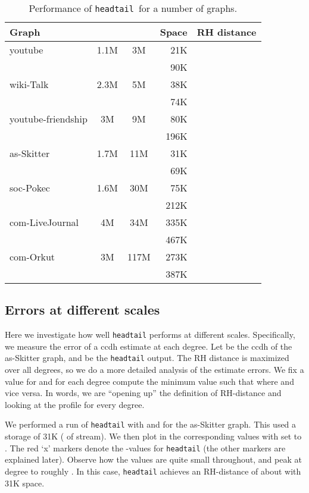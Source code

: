 \documentclass[11pt]{article}
\theoremstyle{definition}
\newcommand{\degdist}{{\tt headtail}}
\begin{document}
\begin{table}
\small
\centering
\begin{tabular}{l|c|c|r|l}
\hline
Graph &  &  & Space & RH distance\\
\hline\hline
youtube & 1.1M & 3M & 21K & \\
& & & 90K & \\\hline
wiki-Talk & 2.3M & 5M & 38K & \\
& & & 74K & \\\hline
youtube-friendship & 3M & 9M & 80K & \\
& & & 196K & \\\hline
as-Skitter & 1.7M & 11M & 31K & \\
& & & 69K & \\\hline
soc-Pokec & 1.6M & 30M& 75K & \\
& & & 212K & \\\hline
com-LiveJournal & 4M & 34M& 335K & \\
& & & 467K & \\\hline
com-Orkut & 3M & 117M& 273K & \\
& & & 387K & \\\hline
\end{tabular}
\caption{Performance of \degdist~for a number of graphs.}
\label{table:manygraphs}
\end{table}

\subsection{Errors at different scales}\label{sec:differentscales}
Here we investigate how well \degdist{} performs at different scales.
Specifically, we measure the error of a ccdh estimate at each degree.  Let 
be the ccdh of the as-Skitter graph, and  be the \degdist{} output.
The RH distance is maximized over all degrees, so we do a more detailed
analysis of the estimate errors.
We fix a value for  and for each
degree  compute the minimum value  such that  where  and vice versa.
In words, we are ``opening up'' the definition of RH-distance and looking at the
profile for every degree.

We performed a run of \degdist{} with  and  for the as-Skitter
graph. This used a storage of 31K ( of stream). We then plot in 
the corresponding  values with  set to  .
The red `\textsf{x}' markers denote the -values for \degdist{} (the
other markers are explained later). Observe how the  values
are quite small throughout, and peak at degree  to roughly .
In this case, \degdist{} achieves an RH-distance of about  with 31K space.
\end{document}
